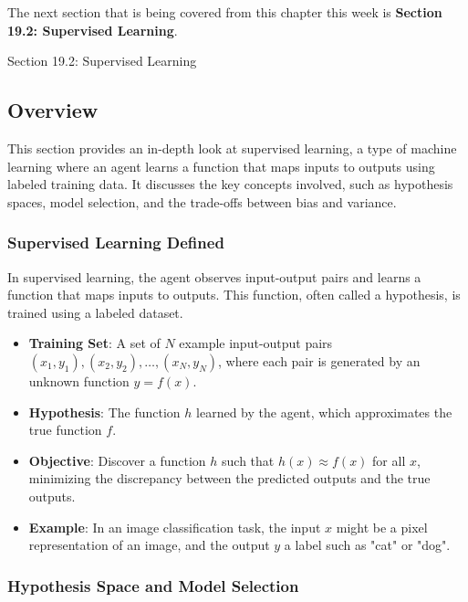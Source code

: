 The next section that is being covered from this chapter this week is \textbf{Section 19.2: Supervised Learning}.

\begin{notes}{Section 19.2: Supervised Learning}
    \subsection*{Overview}

    This section provides an in-depth look at supervised learning, a type of machine learning where an agent learns a function that maps inputs to outputs using labeled training data. It discusses the key 
    concepts involved, such as hypothesis spaces, model selection, and the trade-offs between bias and variance.
    
    \subsubsection*{Supervised Learning Defined}
    
    In supervised learning, the agent observes input-output pairs and learns a function that maps inputs to outputs. This function, often called a hypothesis, is trained using a labeled dataset.
    
    \begin{highlight}
    
        \begin{itemize}
            \item \textbf{Training Set}: A set of $N$ example input-output pairs $(x_1, y_1), (x_2, y_2), \ldots, (x_N, y_N)$, where each pair is generated by an unknown function $y = f(x)$.
            \item \textbf{Hypothesis}: The function $h$ learned by the agent, which approximates the true function $f$.
            \item \textbf{Objective}: Discover a function $h$ such that $h(x) \approx f(x)$ for all $x$, minimizing the discrepancy between the predicted outputs and the true outputs.
            \item \textbf{Example}: In an image classification task, the input $x$ might be a pixel representation of an image, and the output $y$ a label such as "cat" or "dog".
        \end{itemize}
    
    \end{highlight}
    
    \subsubsection*{Hypothesis Space and Model Selection}
    

\end{notes}
